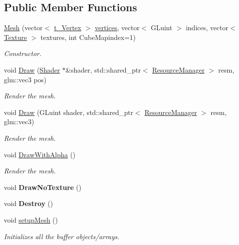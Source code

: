 \subsection*{Public Member Functions}
\begin{DoxyCompactItemize}
\item 
\hyperlink{class_mesh_ab1367e4facd2cd7165d7800c0f5e8f1a}{Mesh} (vector$<$ \hyperlink{structt___vertex}{t\+\_\+\+Vertex} $>$ \hyperlink{class_mesh_ae065969fc6d4864eca63f57d14030a5d}{vertices}, vector$<$ G\+Luint $>$ indices, vector$<$ \hyperlink{struct_texture}{Texture} $>$ textures, int Cube\+Mapindex=1)
\begin{DoxyCompactList}\small\item\em Constructor. \end{DoxyCompactList}\item 
void \hyperlink{class_mesh_a175ba91175ae81444bb4d3a93c343c98}{Draw} (\hyperlink{class_shader}{Shader} $\ast$\&shader, std\+::shared\+\_\+ptr$<$ \hyperlink{class_resource_manager}{Resource\+Manager} $>$ resm, glm\+::vec3 pos)
\begin{DoxyCompactList}\small\item\em Render the mesh. \end{DoxyCompactList}\item 
void \hyperlink{class_mesh_abb81f637776b12623f7903aba64a597b}{Draw} (G\+Luint shader, std\+::shared\+\_\+ptr$<$ \hyperlink{class_resource_manager}{Resource\+Manager} $>$ resm, glm\+::vec3)
\begin{DoxyCompactList}\small\item\em Render the mesh. \end{DoxyCompactList}\item 
void \hyperlink{class_mesh_a0709742dcefaa68370096791963bf055}{Draw\+With\+Alpha} ()\hypertarget{class_mesh_a0709742dcefaa68370096791963bf055}{}\label{class_mesh_a0709742dcefaa68370096791963bf055}

\begin{DoxyCompactList}\small\item\em Render the mesh. \end{DoxyCompactList}\item 
void {\bfseries Draw\+No\+Texture} ()\hypertarget{class_mesh_acdb1558a5dd6337ac2fa6df4db67cd84}{}\label{class_mesh_acdb1558a5dd6337ac2fa6df4db67cd84}

\item 
void {\bfseries Destroy} ()\hypertarget{class_mesh_a7f5641e4a3f2504dc9a07a78c52b93f1}{}\label{class_mesh_a7f5641e4a3f2504dc9a07a78c52b93f1}

\item 
void \hyperlink{class_mesh_aafa4e21067a9b0c4407daf5e3c9ea991}{setup\+Mesh} ()
\begin{DoxyCompactList}\small\item\em Initializes all the buffer objects/arrays. \end{DoxyCompactList}\end{DoxyCompactItemize}
